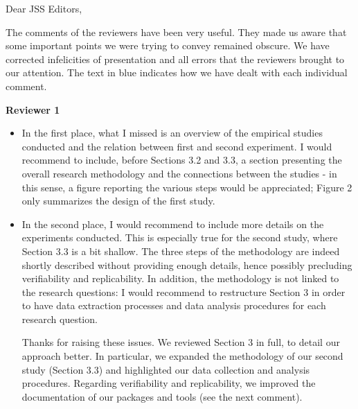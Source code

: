 \documentclass[12pt,english]{scrartcl}
\begin{document}

\begin{letter}{Dear JSS Editors,}
  
\opening{The comments of the reviewers have been very useful. They made us aware that some important points we were trying to convey remained obscure. We have corrected infelicities of presentation and all errors that the reviewers brought to our attention. The text in {\color{blue}blue} indicates how we have dealt with each individual comment.}


{\bf Reviewer 1}

\begin{itemize}
\item In the first place, what I missed is an overview of the empirical studies conducted and the relation between 
first and second experiment. I would recommend to include, before Sections 3.2 and 3.3, a section 
presenting the overall research methodology and the connections between the studies - in this sense, 
a figure reporting the various steps would be appreciated; Figure 2 only summarizes the design of the first study.

\vspace{0.2cm}

\item In the second place, I would recommend to include more details on the experiments conducted. This is especially 
true for the second study, where Section 3.3 is a bit shallow. The three steps of the methodology are indeed shortly 
described without providing enough details, hence possibly precluding verifiability and replicability. In addition, the 
methodology is not linked to the research questions: I would recommend to restructure Section 3 in order to have 
data extraction processes and data analysis procedures for each research question.


\vspace{0.2cm}

{\color{blue}{\bf Answer.} Thanks for raising these issues. We reviewed Section 3 in full,
to detail our approach better. In particular, we expanded the methodology of our
second study (Section 3.3) and highlighted our data collection and analysis procedures.
Regarding verifiability and replicability, we improved the documentation of our
packages and tools (see the next comment).}  


\end{itemize}
\end{letter}
\end{document}
